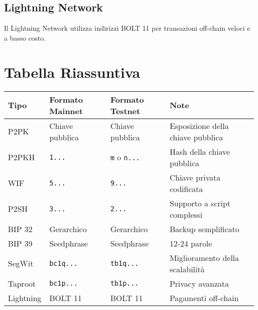 \documentclass{article}
\begin{document}
\subsection{Lightning Network}
Il Lightning Network utilizza indirizzi BOLT 11 per transazioni off-chain veloci e a basso costo.

\section{Tabella Riassuntiva}
\begin{center}
\begin{tabular}{|l|l|l|l|}
\hline
\textbf{Tipo} & \textbf{Formato Mainnet} & \textbf{Formato Testnet} & \textbf{Note} \\
\hline
P2PK & Chiave pubblica & Chiave pubblica & Esposizione della chiave pubblica \\
P2PKH & \texttt{1...} & \texttt{m} o \texttt{n...} & Hash della chiave pubblica \\
WIF & \texttt{5...} & \texttt{9...} & Chiave privata codificata \\
P2SH & \texttt{3...} & \texttt{2...} & Supporto a script complessi \\
BIP 32 & Gerarchico & Gerarchico & Backup semplificato \\
BIP 39 & Seedphrase & Seedphrase & 12-24 parole \\
SegWit & \texttt{bc1q...} & \texttt{tb1q...} & Miglioramento della scalabilit\`a \\
Taproot & \texttt{bc1p...} & \texttt{tb1p...} & Privacy avanzata \\
Lightning & BOLT 11 & BOLT 11 & Pagamenti off-chain \\
\hline
\end{tabular}
\end{center}
\end{document}
